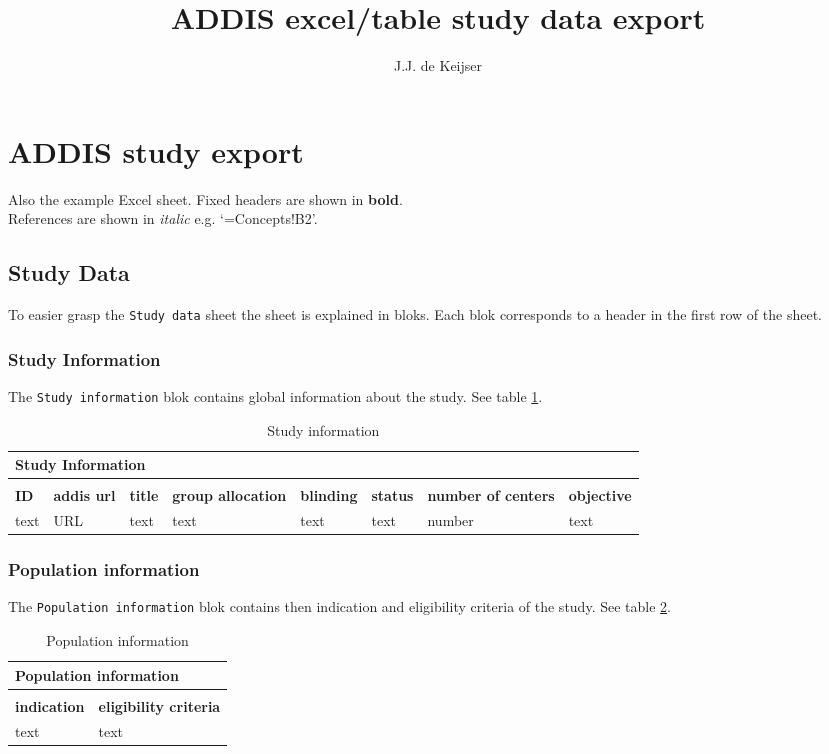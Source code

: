 \documentclass[a4paper,10pt]{article}
\title{ADDIS excel/table study data export}
\author{J.J. de Keijser}
\begin{document}
\maketitle
\section*{ADDIS study export}
Also the example Excel sheet.
Fixed headers are shown in \textbf{bold}.\\
References are shown in \textit{italic} e.g. `=Concepts!B2'.
\subsection*{Study Data}
To easier grasp the \texttt{Study data} sheet the sheet is explained in bloks. Each blok corresponds to a header in the first row of the sheet.

\subsubsection*{Study Information}
The \texttt{Study information} blok contains global information about the study. See table \ref{table:Study Information}.
\begin{table}[h]
  \small
  \centering
  \caption{Study information}
  \label{table:Study Information}
  \begin{tabular}{|l|l|l|l|l|l|l|l|}
    \hline
    \multicolumn{8}{|l|}{Study Information} \\ \hline
    \multicolumn{8}{|l|}{}                  \\ \hline
    \textbf{ID} & \textbf{addis url} & \textbf{title} & \textbf{group allocation} & \textbf{blinding} & \textbf{status} & \textbf{number of centers} & \textbf{objective} \\ \hline
    text & URL & text & text & text & text & number & text \\ \hline
  \end{tabular}
\end{table}

\subsubsection*{Population information}
The \texttt{Population information} blok contains then indication and eligibility criteria of the study. See table \ref{table:Population information}.
\begin{table}[h]
  \centering
  \caption{Population information}
  \label{table:Population information}
  \begin{tabular}{|l|l|}
    \hline
    \multicolumn{2}{|l|}{\textbf{Population information}} \\ \hline
    \multicolumn{2}{|l|}{}                                \\ \hline
    \textbf{indication} & \textbf{eligibility criteria}   \\ \hline
    text & text                                           \\ \hline
  \end{tabular}
\end{table}
\end{document}

